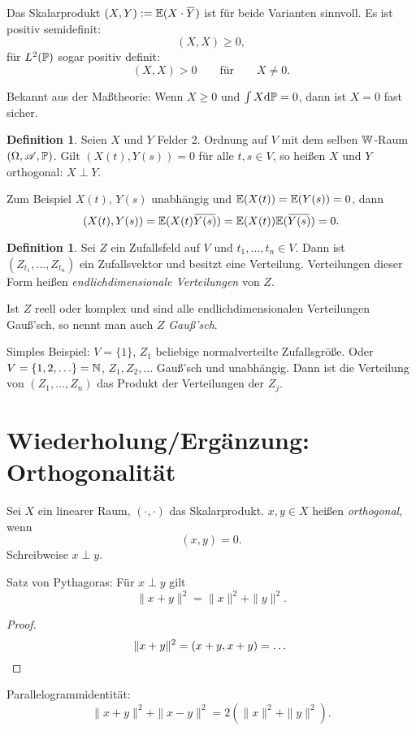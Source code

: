 \documentclass[
 a4paper,
 12pt,
 parskip=half
 ]{scrreprt}
\theoremstyle{plain}
\theoremstyle{definition}
\newtheorem{defn}[thm]{Definition}
\numberwithin{equation}{section}
\begin{document}
Das Skalarprodukt $(X,Y) := \pE( X \cdot \obar{Y})$ ist für beide Varianten
sinnvoll. Es ist positiv semidefinit:
\[ (X,X) \ge 0, \]
für $L^2(\mathbb{P})$ sogar
positiv definit:
\[ (X,X) > 0 \qquad \text{für} \qquad X \ne 0. \]

Bekannt aus der Maßtheorie: Wenn $X \ge 0$ und $\int X \mathrm{d} \mathbb{P} = 0$, dann
ist $X = 0$ fast sicher.

\begin{defn}
  Seien $X$ und $Y$ Felder 2. Ordnung auf $V$ mit dem selben $\mathbb{W}$-Raum
  $(\Omega, \mathscr{A}, \mathbb{P})$. Gilt $(X(t),Y(s)) = 0$ für alle $t,s \in V$, so heißen
  $X$ und $Y$ orthogonal: $X \perp Y$.

  Zum Beispiel $X(t)$, $Y(s)$ unabhängig und $\mathbb{E}(X(t)) = \mathbb{E}(Y(s)) = 0$, dann
  \[ (X(t),Y(s)) = \pE(X(t) \obar{Y(s)}) = \pE(X(t)) \pE(\obar{Y(s)}) = 0. \]
\end{defn}

\begin{defn}
  Sei $Z$ ein Zufallsfeld auf $V$ und $t_1, \ldots, t_n \in V$. Dann ist $(Z_{t_1},
  \ldots, Z_{t_n})$ ein Zufallsvektor und besitzt eine Verteilung. Verteilungen
  dieser Form heißen \emph{endlichdimensionale Verteilungen} von $Z$.

  Ist $Z$ reell oder komplex und sind alle endlichdimensionalen Verteilungen
  Gauß'sch, so nennt man auch $Z$ \emph{Gauß'sch}.

  Simples Beispiel: $V = \{1\}$, $Z_1$ beliebige normalverteilte Zufallsgröße.
  Oder $V = \{1, 2, \ldots\} = \mathbb{N}$, $Z_1, Z_2, \ldots$ Gauß'sch und
  unabhängig. Dann ist die Verteilung von $(Z_1, \ldots, Z_n)$ das Produkt der
  Verteilungen der $Z_j$.
\end{defn}

\section*{Wiederholung/Ergänzung: Orthogonalität}
Sei $X$ ein linearer Raum, $(\cdot, \cdot)$ das Skalarprodukt. $x,y \in X$
heißen \emph{orthogonal}, wenn
\[ (x,y) = 0. \]
Schreibweise $x \perp y$.

Satz von Pythagoras: Für $x \perp y$ gilt
\[ \| x + y \|^2 = \| x \|^2 + \| y \|^2. \]

\begin{proof}
  \[ \|x+y\|^2 = (x+y,x+y) = \ldots \qedhere \]
\end{proof}

Parallelogrammidentität:
\[ \|x+y\|^2 + \|x-y\|^2 = 2(\|x\|^2 + \|y\|^2). \]
\end{document}
